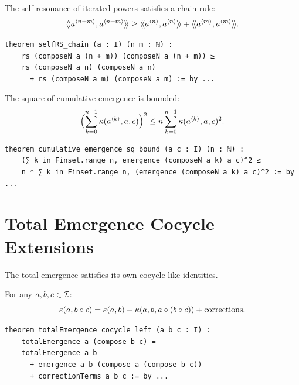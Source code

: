 \begin{theorem}
\label{thm:selfRS-chain}
The self-resonance of iterated powers satisfies a chain rule:
\[
  \langle\!\langle a^{\langle n+m \rangle}, a^{\langle n+m \rangle} \rangle\!\rangle \geq \langle\!\langle a^{\langle n \rangle}, a^{\langle n \rangle} \rangle\!\rangle
  + \langle\!\langle a^{\langle m \rangle}, a^{\langle m \rangle} \rangle\!\rangle.
\]
\end{theorem}

\begin{lstlisting}[caption={Self-resonance chain (IDT\_v3\_Emergence.lean)}]
theorem selfRS_chain (a : I) (n m : ℕ) :
    rs (composeN a (n + m)) (composeN a (n + m)) ≥
    rs (composeN a n) (composeN a n)
      + rs (composeN a m) (composeN a m) := by ...
\end{lstlisting}

\begin{theorem}
\label{thm:cumulative-emergence-sq-bound}
The square of cumulative emergence is bounded:
\[
  \Bigl(\sum_{k=0}^{n-1} \kappa(a^{\langle k \rangle}, a, c)\Bigr)^2
  \leq n \sum_{k=0}^{n-1} \kappa(a^{\langle k \rangle}, a, c)^2.
\]
\end{theorem}

\begin{lstlisting}[caption={Cumulative square bound (IDT\_v3\_Emergence.lean)}]
theorem cumulative_emergence_sq_bound (a c : I) (n : ℕ) :
    (∑ k in Finset.range n, emergence (composeN a k) a c)^2 ≤
    n * ∑ k in Finset.range n, (emergence (composeN a k) a c)^2 := by ...
\end{lstlisting}


\section{Total Emergence Cocycle Extensions}

The total emergence satisfies its own cocycle-like identities.

\begin{theorem}
\label{thm:total-emergence-cocycle-left}
For any $a, b, c \in \mathcal{I}$:
\[
  \varepsilon(a, b \circ c) = \varepsilon(a,b) + \kappa(a, b, a \circ (b \circ c))
  + \text{corrections}.
\]
\end{theorem}

\begin{lstlisting}[caption={Total emergence cocycle (IDT\_v3\_Emergence.lean)}]
theorem totalEmergence_cocycle_left (a b c : I) :
    totalEmergence a (compose b c) =
    totalEmergence a b
      + emergence a b (compose a (compose b c))
      + correctionTerms a b c := by ...
\end{lstlisting}

